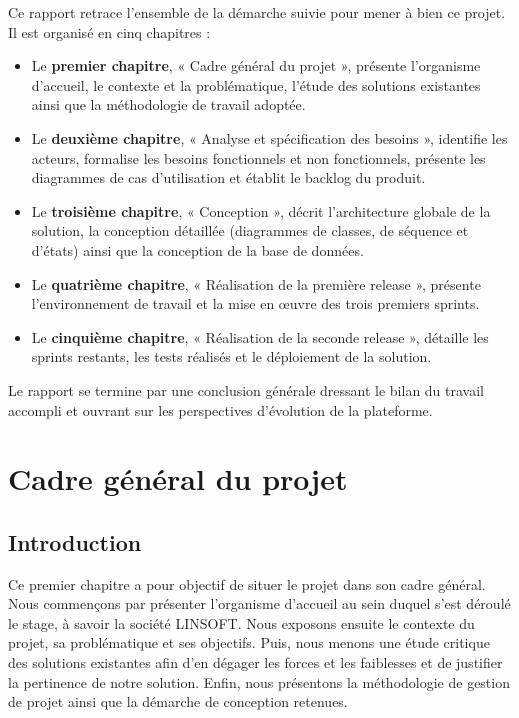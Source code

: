\documentclass[12pt,a4paper,oneside]{report}
\begin{document}
Ce rapport retrace l'ensemble de la démarche suivie pour mener à bien ce projet. Il est
organisé en cinq chapitres :

\begin{itemize}[leftmargin=1.2cm]
  \item Le \textbf{premier chapitre}, « Cadre général du projet », présente l'organisme
  d'accueil, le contexte et la problématique, l'étude des solutions existantes ainsi que la
  méthodologie de travail adoptée.
  \item Le \textbf{deuxième chapitre}, « Analyse et spécification des besoins », identifie les
  acteurs, formalise les besoins fonctionnels et non fonctionnels, présente les diagrammes de
  cas d'utilisation et établit le backlog du produit.
  \item Le \textbf{troisième chapitre}, « Conception », décrit l'architecture globale de la
  solution, la conception détaillée (diagrammes de classes, de séquence et d'états) ainsi que
  la conception de la base de données.
  \item Le \textbf{quatrième chapitre}, « Réalisation de la première release », présente
  l'environnement de travail et la mise en œuvre des trois premiers sprints.
  \item Le \textbf{cinquième chapitre}, « Réalisation de la seconde release », détaille les
  sprints restants, les tests réalisés et le déploiement de la solution.
\end{itemize}

Le rapport se termine par une conclusion générale dressant le bilan du travail accompli et
ouvrant sur les perspectives d'évolution de la plateforme.
\clearpage

\chapter{Cadre général du projet}
\minitoc
\vspace{0.6cm}

\section*{Introduction}
Ce premier chapitre a pour objectif de situer le projet dans son cadre général. Nous
commençons par présenter l'organisme d'accueil au sein duquel s'est déroulé le stage, à savoir
la société LINSOFT. Nous exposons ensuite le contexte du projet, sa problématique et ses
objectifs. Puis, nous menons une étude critique des solutions existantes afin d'en dégager les
forces et les faiblesses et de justifier la pertinence de notre solution. Enfin, nous
présentons la méthodologie de gestion de projet ainsi que la démarche de conception retenues.
\end{document}
